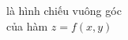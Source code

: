 \documentclass[preview]{standalone}
\begin{document}
\begin{center}
là hình chiếu vuông góc\\của hàm $z = f(x,y)$
\end{center}
\end{document}
